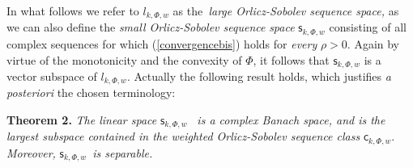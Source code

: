 \documentclass{article}
\begin{document}
\bigskip

In what follows we refer to $l_{k,\Phi ,w}$ as the\textit{\ large
Orlicz-Sobolev sequence space,} as we can also define the \textit{small
Orlicz-Sobolev sequence} \textit{space} $\mathsf{s}_{k,\Phi ,w}$ consisting
of all complex sequences for which (\ref{convergencebis}) holds for \textit{%
every }$\rho >0$. Again by virtue of the monotonicity and the convexity of $%
\Phi $, it follows that $\mathsf{s}_{k,\Phi ,w}$ is a vector subspace of $%
l_{k,\Phi ,w}$. Actually the following result holds, which justifies \textit{%
a posteriori} the chosen terminology:

\bigskip

\textbf{Theorem 2.} \textit{The linear space }$\mathsf{s}_{k,\Phi ,w}$%
\textit{\ is a complex Banach space, and is the largest subspace contained
in the weighted Orlicz-Sobolev sequence class }$\mathsf{c}_{k,\Phi ,w}$. 
\textit{Moreover, }$\mathsf{s}_{k,\Phi ,w}$\textit{\ is separable.}

\textit{\bigskip }
\end{document}
